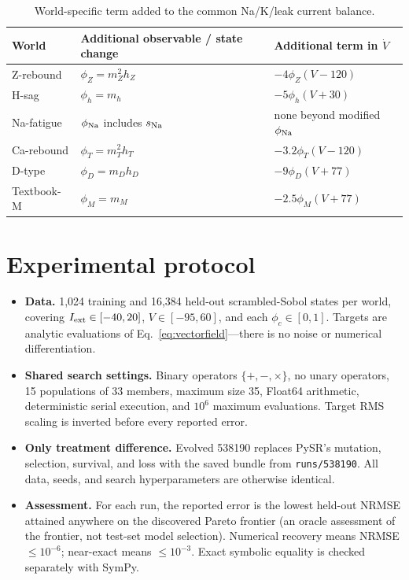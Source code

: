 \documentclass[10pt]{article}
\begin{document}
\begin{table}[h]
\centering
\caption{World-specific term added to the common Na/K/leak current balance.}
\small
\begin{tabular}{lll}
\toprule
World & Additional observable / state change & Additional term in $\dot V$ \\
\midrule
Z-rebound & $\phi_Z=m_Z^2h_Z$ & $-4\phi_Z(V-120)$ \\
H-sag & $\phi_h=m_h$ & $-5\phi_h(V+30)$ \\
Na-fatigue & $\phi_{\rm Na}$ includes $s_{\rm Na}$ & none beyond modified $\phi_{\rm Na}$ \\
Ca-rebound & $\phi_T=m_T^2h_T$ & $-3.2\phi_T(V-120)$ \\
D-type & $\phi_D=m_Dh_D$ & $-9\phi_D(V+77)$ \\
Textbook-M & $\phi_M=m_M$ & $-2.5\phi_M(V+77)$ \\
\bottomrule
\end{tabular}
\end{table}

\section{Experimental protocol}

\begin{itemize}
\item \textbf{Data.} 1,024 training and 16,384 held-out scrambled-Sobol states per world,
covering $I_{\rm ext}\in[-40,20]$, $V\in[-95,60]$, and each $\phi_c\in[0,1]$.
Targets are analytic evaluations of Eq.~\eqref{eq:vectorfield}---there is no noise or numerical differentiation.
\item \textbf{Shared search settings.} Binary operators $\{+,-,\times\}$, no unary operators,
15 populations of 33 members, maximum size 35, Float64 arithmetic, deterministic serial execution,
and $10^6$ maximum evaluations. Target RMS scaling is inverted before every reported error.
\item \textbf{Only treatment difference.} Evolved 538190 replaces PySR's mutation, selection,
survival, and loss with the saved bundle from \texttt{runs/538190}. All data, seeds, and search
hyperparameters are otherwise identical.
\item \textbf{Assessment.} For each run, the reported error is the lowest held-out NRMSE attained
anywhere on the discovered Pareto frontier (an oracle assessment of the frontier, not test-set model selection).
Numerical recovery means NRMSE $\leq10^{-6}$; near-exact means $\leq10^{-3}$.
Exact symbolic equality is checked separately with SymPy.
\end{itemize}
\end{document}
